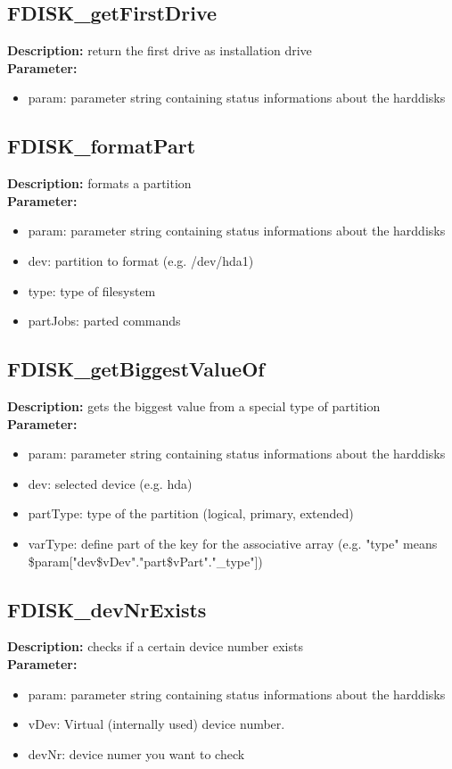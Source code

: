\subsection{FDISK\_getFirstDrive}
\textbf{Description:} return the first drive as installation drive\\
\textbf{Parameter:}
\begin{itemize}
\item param: parameter string containing status informations about the harddisks
\end{itemize}

\subsection{FDISK\_formatPart}
\textbf{Description:} formats a partition\\
\textbf{Parameter:}
\begin{itemize}
\item param: parameter string containing status informations about the harddisks
\item dev: partition to format (e.g. /dev/hda1)
\item type: type of filesystem
\item partJobs: parted commands
\end{itemize}

\subsection{FDISK\_getBiggestValueOf}
\textbf{Description:} gets the biggest value from a special type of partition\\
\textbf{Parameter:}
\begin{itemize}
\item param: parameter string containing status informations about the harddisks
\item dev: selected device (e.g. hda)
\item partType: type of the partition (logical, primary, extended)
\item varType: define part of the key for the associative array (e.g. "type" means \$param["dev\$vDev"."part\$vPart"."\_type"])
\end{itemize}

\subsection{FDISK\_devNrExists}
\textbf{Description:} checks if a certain device number exists\\
\textbf{Parameter:}
\begin{itemize}
\item param: parameter string containing status informations about the harddisks
\item vDev: Virtual (internally used) device number.
\item devNr: device numer you want to check
\end{itemize}

